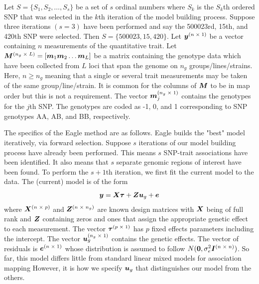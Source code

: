 \documentclass{article}
\begin{document}
Let $S = \{ S_1, S_2, \ldots, S_s\}$ be a set of $s$ ordinal numbers where $S_k$ is the $S_k$th ordered SNP that was 
selected in the $k$th iteration of the model building process. Suppose three iterations  $(s=3)$
have been performed and say the 500023rd, 15th, and 420th
SNP were selected. Then $S=\{500023, 15, 420\}$. 
Let $\bm{y}^{(n \; \times \;1)}$ be a vector containing $n$ measurements of the quantitative trait. 
Let $\bm{M}^{(n_g \; \times \; L)} = [\bm{m}_1 \bm{m}_2 \ldots \bm{m}_L]$ be a matrix containing the genotype data which have been collected 
from $L$ loci that span the genome on $n_g$ groups/lines/strains.  Here, $n \geq n_g$ meaning that a single or several trait measurements 
may be taken of the same group/line/strain. 
 It is common for the columns of $\bm{M}$ to be in map order but this is not a requirement. 
The vector $\bm{m}_j^{(n_g \; \times \; 1)}$ contains the genotypes for the $j$th SNP. 
The genotypes are coded as -1, 0, and 1 corresponding to SNP genotypes AA, AB, and BB, respectively. 

The specifics of the Eagle method are as follows. 
Eagle builds the "best" model iteratively, via forward selection. 
Suppose $s$ iterations of our model building process have already been performed. This means $s$ SNP-trait 
associations have been identified.  It also means that $s$ separate genomic regions of interest have been found.  
To perform the $s+1$th  iteration, we first fit the current model to the data. 
The (current) model is of the form 
\begin{equation}
\label{eq1}
\bm{y} = \bm{X} \bm{\tau} + \bm{Z} \bm{u}_g + \bm{e}
\end{equation}
where 
$\bm{X}^{(n \; \times \; p)}$ and $\bm{Z}^{( n \; \times \; n_g)}$ are known design matrices with $\bm{X}$ being of full rank and $\bm{Z}$ 
containing zeros and ones that assign the appropriate genetic effect to each measurement. 
The vector 
$\bm{\tau}^{(p \; \times \; 1)}$ has $p$ fixed effects parameters including the intercept. The vector 
$\bm{u}_g^{(n_g \; \times \; 1)}$ contains the 
genetic effects. The vector of residuals is 
$\bm{e}^{(n \; \times \;1)}$ whose distribution is assumed to follow $N(\bm{0}, \sigma^2_e \bm{I}^{(n \; \times \; n)})$. 
So far,  this model differs little from standard linear mixed models for association mapping \citep{yu2006unified,zhao2007arabidopsis} 
However, 
it is how we specify $\bm{u}_g$ that distinguishes our model from the others. 
\end{document}
